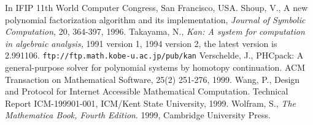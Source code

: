 \begin{thebibliography}{X}
In IFIP 11th World Computer Congress, San Francisco, USA.
Shoup, V., 
A new polynomial factorization algorithm and 
its implementation,
{\sl Journal of Symbolic Computation}, 20, 364-397, 1996.
Takayama, N.,
{\em Kan: A system for computation in
algebraic analysis,} 1991 version 1,
1994 version 2, the latest version is 2.991106. 
{\tt ftp://ftp.math.kobe-u.ac.jp/pub/kan}
Verschelde, J.,
PHCpack: A general-purpose solver for polynomial systems by
homotopy continuation.  ACM Transaction on Mathematical Software, 25(2) 
251-276, 1999.
Wang, P.,
Design and Protocol for Internet Accessible Mathematical Computation.
Technical Report ICM-199901-001, ICM/Kent State University, 1999.
Wolfram, S.,
{\it The Mathematica Book, Fourth Edition}.
1999, Cambridge University Press.
\end{thebibliography}
